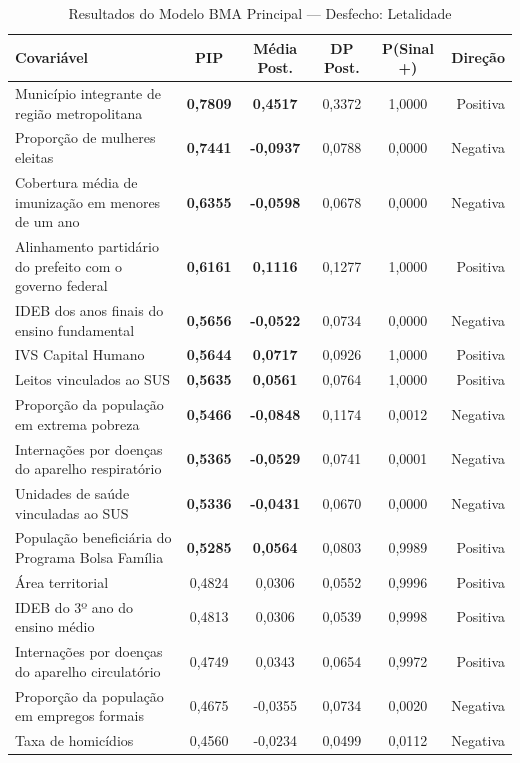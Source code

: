 \begin{table}[htbp]
\centering
\footnotesize
\caption{Resultados do Modelo BMA Principal — Desfecho: Letalidade}
\label{tab:bma_letalidade}
\begin{tabular}{lccccr}
\toprule
\textbf{Covariável} & \textbf{PIP} & \textbf{Média Post.} & \textbf{DP Post.} & \textbf{P(Sinal +)} & \textbf{Direção} \\
\midrule
Município integrante de região metropolitana & \textbf{0,7809} & \textbf{0,4517} & 0,3372 & 1,0000 & Positiva \\
Proporção de mulheres eleitas & \textbf{0,7441} & \textbf{-0,0937} & 0,0788 & 0,0000 & Negativa \\
Cobertura média de imunização em menores de um ano & \textbf{0,6355} & \textbf{-0,0598} & 0,0678 & 0,0000 & Negativa \\
Alinhamento partidário do prefeito com o governo federal & \textbf{0,6161} & \textbf{0,1116} & 0,1277 & 1,0000 & Positiva \\
IDEB dos anos finais do ensino fundamental & \textbf{0,5656} & \textbf{-0,0522} & 0,0734 & 0,0000 & Negativa \\
IVS Capital Humano & \textbf{0,5644} & \textbf{0,0717} & 0,0926 & 1,0000 & Positiva \\
Leitos vinculados ao SUS & \textbf{0,5635} & \textbf{0,0561} & 0,0764 & 1,0000 & Positiva \\
Proporção da população em extrema pobreza & \textbf{0,5466} & \textbf{-0,0848} & 0,1174 & 0,0012 & Negativa \\
Internações por doenças do aparelho respiratório & \textbf{0,5365} & \textbf{-0,0529} & 0,0741 & 0,0001 & Negativa \\
Unidades de saúde vinculadas ao SUS & \textbf{0,5336} & \textbf{-0,0431} & 0,0670 & 0,0000 & Negativa \\
População beneficiária do Programa Bolsa Família & \textbf{0,5285} & \textbf{0,0564} & 0,0803 & 0,9989 & Positiva \\
Área territorial & 0,4824 & 0,0306 & 0,0552 & 0,9996 & Positiva \\
IDEB do 3º ano do ensino médio & 0,4813 & 0,0306 & 0,0539 & 0,9998 & Positiva \\
Internações por doenças do aparelho circulatório & 0,4749 & 0,0343 & 0,0654 & 0,9972 & Positiva \\
Proporção da população em empregos formais & 0,4675 & -0,0355 & 0,0734 & 0,0020 & Negativa \\
Taxa de homicídios & 0,4560 & -0,0234 & 0,0499 & 0,0112 & Negativa \\

\end{tabular}
\end{table}
